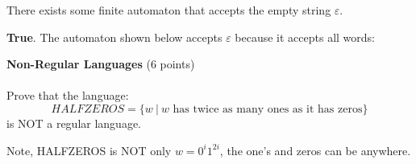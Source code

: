 \documentclass[12pt]{article}
\newenvironment{question}[2][Question]{\begin{trivlist}
\item[\hskip \labelsep {\bfseries #1}\hskip \labelsep {\bfseries #2.}]}{\end{trivlist}}
\newenvironment{solution}[1][Solution:]{\begin{trivlist}
\item[\hskip \labelsep {\bfseries #1}\hskip \labelsep {\bfseries}]\color{blue}}{\end{trivlist}}
\begin{document}
\begin{question}{6}
\begin{enumerate}[(a)]
\begin{solution}
\end{solution}

\item There exists some finite automaton that accepts the empty string $\varepsilon$.
\begin{solution}
    \textbf{True}. The automaton shown below accepts $\varepsilon$ because it accepts all words:
\begin{center}
\end{center}    
\end{solution}
\end{enumerate}
\end{question}

\clearpage
\begin{question}{7}\textbf{Non-Regular Languages} (6 points)\\\\
Prove that the language: \[HALFZEROS = \{w \ | \ w \text{ has twice as many ones as it has zeros}\} \] is NOT a regular language.

Note, HALFZEROS is NOT only $w = 0^i1^{2i}$, the one's and zeros can be anywhere.
\end{question}
\end{document}
